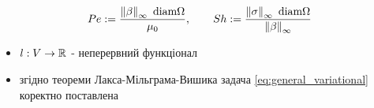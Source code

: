 \begin{frame}[allowframebreaks]
	\begin{equation}
		Pe:= \frac{\left\lVert\beta\right\rVert_\infty \text{ diam} \Omega}{\mu_0}, \qquad
		Sh:= \frac{\left\lVert\sigma\right\rVert_\infty \text{ diam} \Omega}{\left\lVert\beta\right\rVert_\infty}
	\end{equation}

	\begin{itemize}
		\item $l : V \to \mathbb{R}$ - неперервний функціонал
		\item згідно теореми Лакса-Мільграма-Вишика задача \eqref{eq:general_variational} коректно поставлена
	\end{itemize}
\end{frame}

\undef{\vonenorm}

